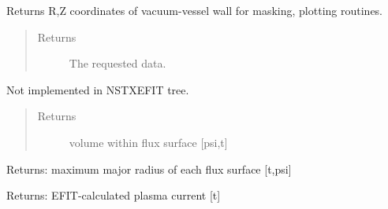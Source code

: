 \documentclass[letterpaper,10pt,english]{sphinxmanual}
\begin{document}
\begin{fulllineitems}
\begin{fulllineitems}
\end{fulllineitems}


\begin{fulllineitems}
\label{eqtools:eqtools.NSTXEFIT.NSTXEFITTree.getMachineCrossSection}
Returns R,Z coordinates of vacuum-vessel wall for masking, plotting routines.
\begin{quote}\begin{description}
\item[{Returns}] \leavevmode
The requested data.

\end{description}\end{quote}

\end{fulllineitems}


\begin{fulllineitems}
\label{eqtools:eqtools.NSTXEFIT.NSTXEFITTree.getFluxVol}
Not implemented in NSTXEFIT tree.
\begin{quote}\begin{description}
\item[{Returns}] \leavevmode
volume within flux surface {[}psi,t{]}

\end{description}\end{quote}

\end{fulllineitems}


\begin{fulllineitems}
\label{eqtools:eqtools.NSTXEFIT.NSTXEFITTree.getRmidPsi}
Returns:
maximum major radius of each flux surface {[}t,psi{]}

\end{fulllineitems}


\begin{fulllineitems}
\label{eqtools:eqtools.NSTXEFIT.NSTXEFITTree.getIpCalc}
Returns:
EFIT-calculated plasma current {[}t{]}


\end{fulllineitems}
\end{fulllineitems}
\end{document}
